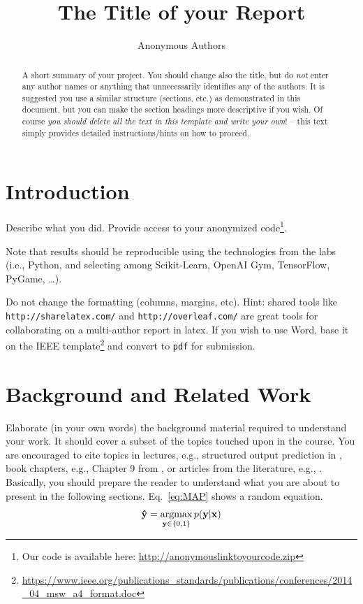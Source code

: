 \documentclass[journal, a4paper]{IEEEtran}
\newcommand{\argmax}{\operatornamewithlimits{argmax}}
\newcommand{\x}{\mathbf{x}}
\newcommand{\y}{\mathbf{y}}
\newcommand{\ypred}{\mathbf{\hat y}}
\begin{document}
\title{The Title of your Report}
\author{Anonymous Authors}
\maketitle

\begin{abstract}
	A short summary of your project. You should change also the title, but do \emph{not} enter any author names or anything that unnecessarily identifies any of the authors. It is suggested you use a similar structure (sections, etc.) as demonstrated in this document, but you can make the section headings more descriptive if you wish. Of course \emph{you should delete all the text in this template and write your own}! -- this text simply provides detailed instructions/hints on how to proceed.

\end{abstract}

\section{Introduction}

Describe what you did. Provide access to your anonymized code\footnote{Our code is available here: \url{http://anonymouslinktoyourcode.zip}}.

Note that results should be reproducible using the technologies from the labs (i.e., Python, and selecting among Scikit-Learn, OpenAI Gym, TensorFlow, PyGame, \ldots).

Do not change the formatting (columns, margins, etc). Hint: shared tools like \texttt{http://sharelatex.com/} and \texttt{http://overleaf.com/} are great tools for collaborating on a multi-author report in latex. If you wish to use Word, base it on the IEEE template\footnote{\url{https://www.ieee.org/publications_standards/publications/conferences/2014_04_msw_a4_format.doc}} and convert to \texttt{pdf} for submission. 

\section{Background and Related Work}

Elaborate (in your own words) the background material required to understand your work. It should cover a subset of the topics touched upon in the course. You are encouraged to cite topics in lectures, e.g., structured output prediction in \cite{LectureSOP}, book chapters, e.g., Chapter 9 from \cite{Barber}, or articles from the literature, e.g., \cite{Astar,DeepMindSC2}. Basically, you should prepare the reader to understand what you are about to present in the following sections. Eq.~\eqref{eq:MAP} shows a random equation.
\begin{equation}
	\label{eq:MAP}
	\ypred = \argmax_{\y \in \{0,1\}} p(\y|\x)
\end{equation}
\end{document}
